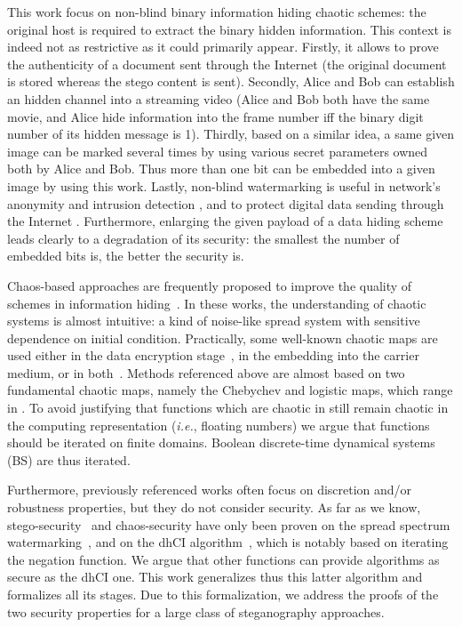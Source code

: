 \documentclass{comjnl}
\begin{document}
This work focus on non-blind  binary information hiding chaotic schemes: 
the  original host  is  required  to  extract the  binary hidden
information. This  context is indeed not
as restrictive as it could primarily appear.
Firstly, it allows to prove 
the authenticity of a document sent  through the  Internet 
(the original document is stored whereas the stego content is sent). 
Secondly, Alice and Bob can establish an hidden channel into a
streaming video 
(Alice and Bob both have the same movie, and  Alice hide information into 
the frame number   iff the binary digit
number  of its hidden message is  1).
Thirdly, based on a similar idea, a same
given image can be marked  several times by using various secret parameters
owned both by Alice and Bob. Thus more than one bit can be embedded into a given
image  by using  this work. Lastly,  non-blind watermarking  is
useful in  network's anonymity and intrusion  detection \cite{Houmansadr09}, and
to protect digital data sending through the Internet \cite{P1150442004}.
Furthermore,  enlarging the given payload  of a data  hiding scheme leads
clearly to  a degradation of its  security: the smallest the  number of embedded
bits is, the better the security is.


Chaos-based approaches are frequently proposed to improve
the quality of schemes in information 
hiding~\cite{Wu2007,Liu07,CongJQZ06,Zhu06}.
In these works, the understanding of chaotic systems
is almost intuitive: a kind of noise-like spread system
with sensitive dependence on initial condition.
Practically, some well-known chaotic maps are used
either in the data encryption stage~\cite{Liu07,CongJQZ06}, 
in the embedding into the carrier medium,
or in both~\cite{Wu2007,Wu2007bis}.
Methods referenced above are almost based on two
fundamental chaotic maps, namely the Chebychev and logistic maps, which range in . 
To avoid justifying that functions which are chaotic in 
still remain chaotic in the computing representation (\textit{i.e.},
floating numbers) we argue that functions should be iterated on finite domains.
Boolean discrete-time dynamical systems (BS) are thus iterated.

Furthermore, previously referenced works often focus on  
discretion and/or robustness properties, but they do not consider security.  
As far as we know, stego-security~\cite{Cayre2008} and chaos-security 
have only been proven 
on the spread spectrum watermarking~\cite{Cox97securespread},
and on
the dhCI algorithm~\cite{gfb10:ip}, which is notably based on iterating  
the negation function.
We argue that other functions can provide algorithms as secure as the dhCI one.
This work generalizes thus this latter algorithm and formalizes all
its stages. Due to this formalization, we address the proofs of the two
security properties for a large class of steganography approaches.  
\end{document}
